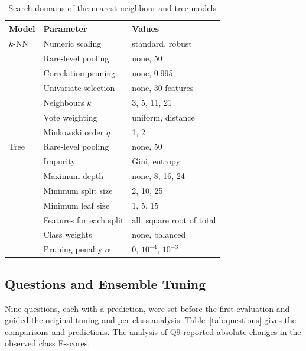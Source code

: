 \documentclass[conference]{IEEEtran}
\newcommand{\knn}{\mbox{$k$-NN}}
\begin{document}
\begin{table}[!t]
    \caption{Search domains of the nearest neighbour and tree models}
    \label{tab:domains}
    \centering\footnotesize
    \begin{tabular}{@{}lll@{}}
        \toprule
        Model    & Parameter                & Values                       \\
        \midrule
        \knn     & Numeric scaling          & standard, robust             \\
                 & Rare-level pooling       & none, 50                     \\
                 & Correlation pruning      & none, 0.995                  \\
                 & Univariate selection     & none, 30 features            \\
                 & Neighbours $k$           & 3, 5, 11, 21                 \\
                 & Vote weighting           & uniform, distance            \\
                 & Minkowski order $q$      & 1, 2                         \\
        \midrule
        Tree     & Rare-level pooling       & none, 50                     \\
                 & Impurity                 & Gini, entropy                \\
                 & Maximum depth            & none, 8, 16, 24              \\
                 & Minimum split size              & 2, 10, 25                    \\
                 & Minimum leaf size   & 1, 5, 15                     \\
                 & Features for each split  & all, square root of total    \\
                 & Class weights            & none, balanced               \\
                 & Pruning penalty $\alpha$ & $0$, $10^{-4}$, $10^{-3}$    \\
        \bottomrule
    \end{tabular}
\end{table}

\subsection{Questions and Ensemble Tuning}
Nine questions, each with a prediction, were set before the first evaluation and guided the original tuning and per-class analysis. Table~\ref{tab:questions} gives the comparisons and predictions. The analysis of Q9 reported absolute changes in the observed class F-scores.
\end{document}
